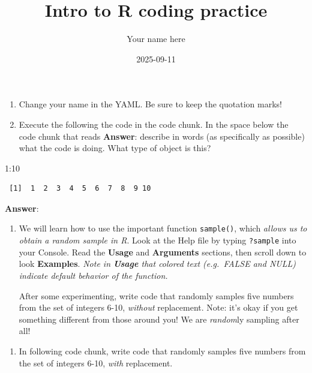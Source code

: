 \documentclass[
  letterpaper,
  DIV=11,
  numbers=noendperiod]{scrartcl}
\title{Intro to R coding practice}
\author{Your name here}
\date{2025-09-11}
\newenvironment{Shaded}{\begin{snugshade}}{\end{snugshade}}
\newcommand{\DecValTok}[1]{\textcolor[rgb]{0.68,0.00,0.00}{#1}}
\newcommand{\SpecialCharTok}[1]{\textcolor[rgb]{0.37,0.37,0.37}{#1}}
\providecommand{\tightlist}{%
  \setlength{\itemsep}{0pt}\setlength{\parskip}{0pt}}
\begin{document}
\maketitle


\begin{enumerate}
\def\labelenumi{\arabic{enumi}.}
\item
  Change your name in the YAML. Be sure to keep the quotation marks!
\item
  Execute the following the code in the code chunk. In the space below
  the code chunk that reads \textbf{Answer}: describe in words (as
  specifically as possible) what the code is doing. What type of object
  is this?
\end{enumerate}

\begin{Shaded}
\begin{Highlighting}[]
\DecValTok{1}\SpecialCharTok{:}\DecValTok{10}
\end{Highlighting}
\end{Shaded}

\begin{verbatim}
 [1]  1  2  3  4  5  6  7  8  9 10
\end{verbatim}

\textbf{Answer}:

\begin{enumerate}
\def\labelenumi{\arabic{enumi}.}
\setcounter{enumi}{2}
\item
  We will learn how to use the important function \texttt{sample()},
  which \emph{allows us to obtain a random sample in R}. Look at the
  Help file by typing \texttt{?sample} into your Console. Read the
  \textbf{Usage} and \textbf{Arguments} sections, then scroll down to
  look \textbf{Examples}. \emph{Note in \textbf{Usage} that colored text
  (e.g.~FALSE and NULL) indicate default behavior of the function.}

  After some experimenting, write code that randomly samples five
  numbers from the set of integers 6-10, \emph{without} replacement.
  Note: it's okay if you get something different from those around you!
  We are \emph{random}ly sampling after all!
\end{enumerate}

\begin{enumerate}
\def\labelenumi{\arabic{enumi}.}
\setcounter{enumi}{3}
\tightlist
\item
  In following code chunk, write code that randomly samples five numbers
  from the set of integers 6-10, \emph{with} replacement.
\end{enumerate}
\end{document}
